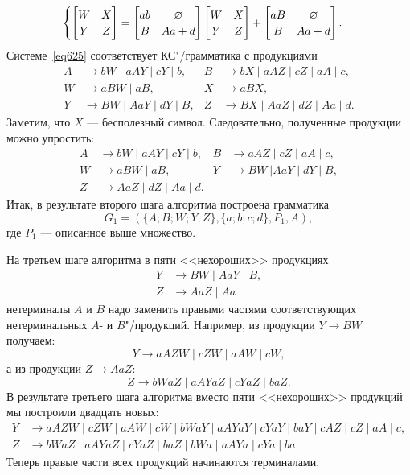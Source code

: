 \begin{myexample}
\begin{equation}
\begin{cases}
        \begin{bmatrix}
            W & X \\
            Y & Z
        \end{bmatrix}
            =
            \begin{bmatrix}
                ab & \varnothing \\
                B & Aa+d
            \end{bmatrix}
            \begin{bmatrix}
                W & X \\
                Y & Z
            \end{bmatrix}
            +
            \begin{bmatrix}
                aB & \varnothing \\
                B & Aa+d
            \end{bmatrix}
            .
    \end{cases}
\end{equation}
Системе~\ref{eq625} соответствует КС"/грамматика с продукциями
\begin{align*}
	A &\to bW \mid aAY \mid cY \mid b, &
    B &\to bX \mid aAZ \mid cZ \mid aA \mid c, \\
    W &\to aBW \mid aB, &
    X &\to aBX, \\
    Y &\to BW \mid AaY \mid dY \mid B, &
    Z &\to BX \mid AaZ \mid dZ \mid Aa \mid d.
\end{align*}
Заметим, что $X$ --- бесполезный символ. Следовательно, полученные продукции можно упростить:
\begin{align*}
    A &\to bW \mid aAY \mid cY \mid b, &
    B &\to aAZ \mid cZ \mid aA \mid c, \\
    W &\to aBW \mid aB, &
    Y &\to BW~|AaY \mid dY \mid B, \\
    Z &\to AaZ \mid dZ \mid Aa \mid d.
\end{align*}
Итак, в результате второго шага алгоритма построена грамматика
\[
    G_1 = (\{A;B;W;Y;Z\},\{a;b;c;d\},P_1,A),
\]
где $P_1$ --- описанное выше множество.

На третьем шаге алгоритма в пяти <<нехороших>> продукциях
\begin{align*}
    Y &\to BW \mid AaY \mid B, \\
    Z &\to AaZ \mid Aa
\end{align*}
нетерминалы $A$ и $B$ надо заменить правыми частями
соответствующих нетерминальных $A$- и $B$"/продукций.
Например, из продукции $Y \to BW$ получаем:
\[
    Y \to aAZW \mid cZW \mid aAW \mid cW,
\]
а из продукции $Z \to AaZ$:
\[
    Z \to bWaZ \mid aAYaZ \mid cYaZ \mid baZ.
\]
В результате третьего шага алгоритма вместо пяти <<нехороших>> продукций мы построили двадцать новых:
\begin{align*}
    Y &\to aAZW \mid cZW \mid aAW \mid cW \mid bWaY \mid aAYaY
        \mid cYaY \mid baY \mid cAZ \mid cZ \mid aA \mid c, \\
    Z &\to bWaZ \mid aAYaZ \mid cYaZ \mid baZ \mid bWa \mid aAYa
        \mid cYa \mid ba.
\end{align*}
Теперь правые части всех продукций начинаются терминалами.


\end{myexample}
